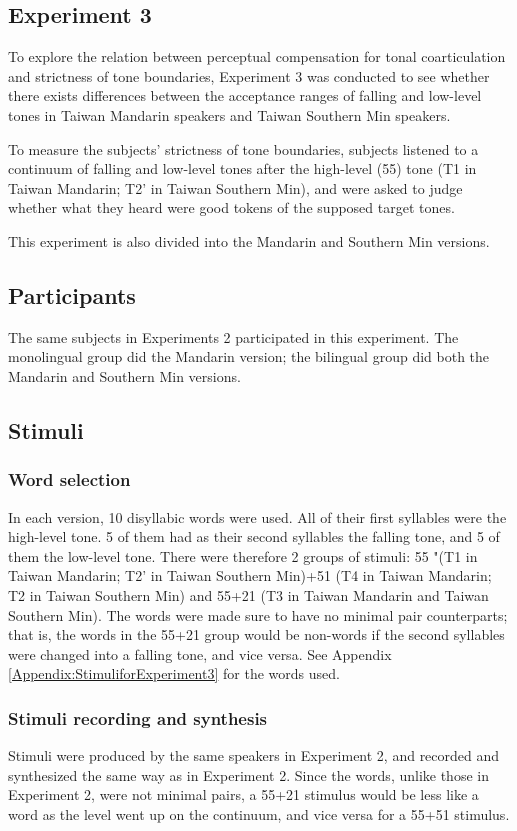 \documentclass[12pt]{report}
\begin{document}
\begin{CJK}{UTF8}{bsmi}
\section{Experiment 3}\label{section:Experiment3}
To explore the relation between perceptual compensation for tonal coarticulation and strictness of tone boundaries, Experiment 3 was conducted to see whether there exists differences between the acceptance ranges of falling and low-level tones in Taiwan Mandarin speakers and Taiwan Southern Min speakers.

To measure the subjects' strictness of tone boundaries, subjects listened to a continuum of falling and low-level tones after the high-level (55) tone (T1 in Taiwan Mandarin; T2' in Taiwan Southern Min), and were asked to judge whether what they heard were good tokens of the supposed target tones.

This experiment is also divided into the Mandarin and Southern Min versions.

\subsection{Participants}
The same subjects in Experiments 2 participated in this experiment. The monolingual group did the Mandarin version; the bilingual group did both the Mandarin and Southern Min versions.

\subsection{Stimuli}
\subsubsection{Word selection} In each version, 10 disyllabic words were used. All of their first syllables were the high-level tone. 5 of them had as their second syllables the falling tone, and 5 of them the low-level tone. There were therefore 2 groups of stimuli: 55 "(T1 in Taiwan Mandarin; T2' in Taiwan Southern Min)+51 (T4 in Taiwan Mandarin; T2 in Taiwan Southern Min) and 55+21 (T3 in Taiwan Mandarin and Taiwan Southern Min). The words were made sure to have no minimal pair counterparts; that is, the words in the 55+21 group would be non-words if the second syllables were changed into a falling tone, and vice versa. See Appendix \ref{Appendix:StimuliforExperiment3} for the words used.

\subsubsection{Stimuli recording and synthesis}
Stimuli were produced by the same speakers in Experiment 2, and recorded and synthesized the same way as in Experiment 2. Since the words, unlike those in Experiment 2, were not minimal pairs, a 55+21 stimulus would be less like a word as the level went up on the continuum, and vice versa for a 55+51 stimulus.


\end{CJK}
\end{document}
